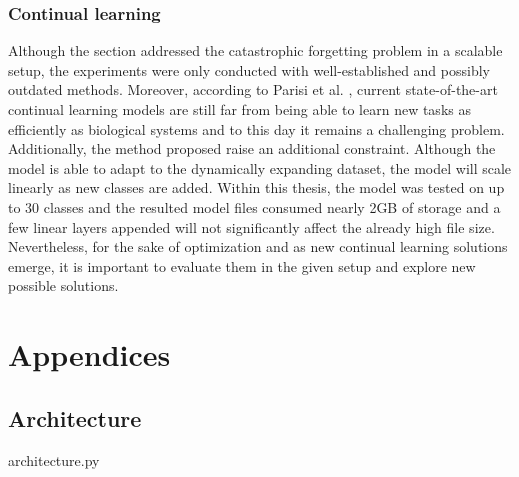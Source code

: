 \documentclass[english, 12pt, a4paper, elec, utf8, a-1b, online]{aaltothesis}
\begin{document}
\subsubsection{Continual learning}
Although the  section addressed the catastrophic forgetting problem in a scalable setup, the experiments were only conducted with well-established and possibly outdated methods. Moreover, according to Parisi et al. \cite{Parisi2018}, current state-of-the-art continual learning models are still far from being able to learn new tasks as efficiently as biological systems and to this day it remains a challenging problem. Additionally, the method proposed raise an additional constraint. Although the model is able to adapt to the dynamically expanding dataset, the model will scale linearly as new classes are added. Within this thesis, the model was tested on up to 30 classes and the resulted model files consumed nearly 2GB of storage and a few linear layers appended will not significantly affect the already high file size. Nevertheless, for the sake of optimization and as new continual learning solutions emerge, it is important to evaluate them in the given setup and explore new possible solutions. 




\clearpage







\clearpage

\thesisappendix

\section{Appendices}
\label{appendix} 
\subsection{Architecture}

{architecture.py}
\end{document}

